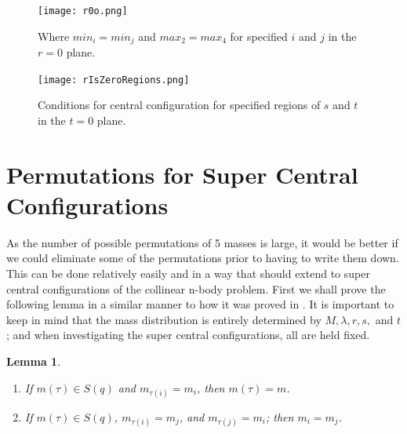 \documentclass[11pt,leqno]{article}
\newtheorem{lemma}[theorem]{Lemma}
\theoremstyle{definition}
\theoremstyle{remark}
\numberwithin{equation}{section}
\begin{document}
\begin{figure}
\texttt{[image: r0o.png]}
 \caption{  Where $min_i=min_j$ and $max_2=max_4$ for specified $i$ and $j$ in the $r=0$ plane.}
 \label{r0o} 
\end{figure}

\begin{figure}
\texttt{[image: rIsZeroRegions.png]}
 \caption{  Conditions for central configuration for specified regions of $s$ and $t$ in the $t=0$ plane.}
 \label{rzr} 
\end{figure}


\section{Permutations for Super Central Configurations}
As the number of possible permutations of 5 masses is large, it would be better if we could eliminate some of the permutations prior to having to write them down. This can be done relatively easily and in a way that should extend to super central configurations of the collinear n-body problem. First we shall prove the following lemma in a similar manner to how it was proved in \cite{ZX3}. It is important to keep in mind that the mass distribution is entirely determined by $M, \lambda, r,s,$ and $t$; and when investigating the super central configurations, all are held fixed.

\begin{lemma}
\begin{enumerate}
Fix $q=(-s-1, -1, r, 1, t+1)$ with $(s,t)\in \mathbf{R^+}^3$ and $-1<r<1$. Suppose $m=(m_1, m_2, m_3, m_4, m_5)\in S(q)$ and $\tau \in P(5)$. 
\item If $m(\tau)\in S(q)$ and $m_{\tau(i)}=m_i$, then $m(\tau)=m$.
\item If $m(\tau) \in S(q)$, $m_{\tau(i)}=m_j$, and $m_{\tau(j)}=m_i$; then $m_i=m_j$.
\end{enumerate}
\end{lemma}
\end{document}
